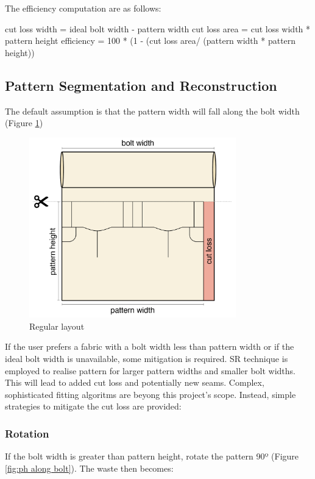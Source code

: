 The efficiency computation are as follows:

cut loss width = ideal bolt width - pattern width \newline
cut loss area = cut loss width * pattern height \newline
efficiency = 100 * (1 - (cut loss area/ (pattern width * pattern height))


\subsection{Pattern Segmentation and Reconstruction}
The default assumption is that the pattern width will fall along the bolt width (Figure \ref{fig:pw along bolt})
\begin{figure} [htb]
    \centering 
    \includegraphics[width = 0.8\textwidth]{Images/regular layout.png}
    \caption{Regular layout}
    \label{fig:pw along bolt}
\end{figure}

If the user prefers a fabric with a bolt width less than pattern width or if the ideal bolt width is unavailable, some mitigation is required. SR technique is employed to realise pattern for larger pattern widths and smaller bolt widths. This will lead to added cut loss and potentially new seams. Complex, sophisticated fitting algoritms are beyong this project's scope. Instead, simple strategies to mitigate the cut loss are provided:

\subsubsection{Rotation}
If the bolt width is greater than pattern height, rotate the pattern 90º (Figure \ref{fig:ph along bolt}).
The waste then becomes:

